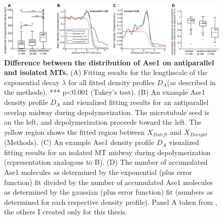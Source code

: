 \begin{figure}[h]
    \centering
    \includegraphics[width=1\linewidth]{Figures/ase2e.png}
    \caption[Difference between the distribution of Ase1 on antiparallel and isolated MTs.]{\textbf{Difference between the distribution of Ase1 on antiparallel and isolated MTs.}
    (A) Fitting results for the lengthscale of the exponential decay $\lambda$ for all fitted density profiles $D_A $(as described in the methods). *** p<0.001 (Tukey's test). (B) An example Ase1 density profile $D_A$ and visualized fitting results for an antiparallel overlap midway during depolymerization. The microtubule seed is on the left, and depolymerization proceeds toward the left. The yellow region shows the fitted region between $X_{Dsleft}$ and $X_{Dsright}$ (Methods). (C) An example Ase1 density profile $D_A$ visualized fitting results for an isolated MT midway during depolymerization (representation analogous to B). (D) The number of accumulated Ase1 molecules as determined by the exponential (plus error function) fit divided by the number of accumulated Ase1 molecules as determined by the gaussian (plus error function) fit (numbers as determined for each respective density profile). Panel A taken from \cite{Krattenmacher2024}, the others I created only for this thesis.
        }\label{ase2e}
\end{figure}